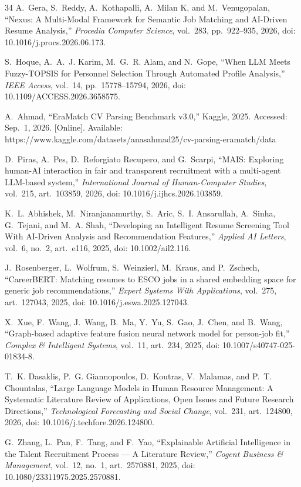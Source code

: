 \documentclass[journal]{IEEEtran}
\begin{document}
\begin{thebibliography}{34}
A.~Gera, S.~Reddy, A.~Kothapalli, A.~Milan K, and M.~Venugopalan, ``Nexus: A Multi-Modal Framework for Semantic Job Matching and AI-Driven Resume Analysis,'' \emph{Procedia Computer Science}, vol.~283, pp.~922--935, 2026, doi: 10.1016/j.procs.2026.06.173.

S.~Hoque, A.~A.~J. Karim, M.~G.~R. Alam, and N.~Gope, ``When LLM Meets Fuzzy-TOPSIS for Personnel Selection Through Automated Profile Analysis,'' \emph{IEEE Access}, vol.~14, pp.~15778--15794, 2026, doi: 10.1109/ACCESS.2026.3658575.

A.~Ahmad, ``EraMatch CV Parsing Benchmark v3.0,'' Kaggle, 2025. Accessed: Sep.~1, 2026. [Online]. Available: https://www.kaggle.com/datasets/anasahmad25/cv-parsing-eramatch/data

D.~Piras, A.~Pes, D.~Reforgiato Recupero, and G.~Scarpi, ``MAIS: Exploring human-AI interaction in fair and transparent recruitment with a multi-agent LLM-based system,'' \emph{International Journal of Human-Computer Studies}, vol.~215, art.~103859, 2026, doi: 10.1016/j.ijhcs.2026.103859.

K.~L. Abhishek, M.~Niranjanamurthy, S.~Aric, S.~I. Ansarullah, A.~Sinha, G.~Tejani, and M.~A. Shah, ``Developing an Intelligent Resume Screening Tool With AI-Driven Analysis and Recommendation Features,'' \emph{Applied AI Letters}, vol.~6, no.~2, art.~e116, 2025, doi: 10.1002/ail2.116.

J.~Rosenberger, L.~Wolfrum, S.~Weinzierl, M.~Kraus, and P.~Zschech, ``CareerBERT: Matching resumes to ESCO jobs in a shared embedding space for generic job recommendations,'' \emph{Expert Systems With Applications}, vol.~275, art.~127043, 2025, doi: 10.1016/j.eswa.2025.127043.

X.~Xue, F.~Wang, J.~Wang, B.~Ma, Y.~Yu, S.~Gao, J.~Chen, and B.~Wang, ``Graph-based adaptive feature fusion neural network model for person-job fit,'' \emph{Complex \& Intelligent Systems}, vol.~11, art.~234, 2025, doi: 10.1007/s40747-025-01834-8.

T.~K. Dasaklis, P.~G. Giannopoulos, D.~Koutras, V.~Malamas, and P.~T. Chountalas, ``Large Language Models in Human Resource Management: A Systematic Literature Review of Applications, Open Issues and Future Research Directions,'' \emph{Technological Forecasting and Social Change}, vol.~231, art.~124800, 2026, doi: 10.1016/j.techfore.2026.124800.

G.~Zhang, L.~Pan, F.~Tang, and F.~Yao, ``Explainable Artificial Intelligence in the Talent Recruitment Process --- A Literature Review,'' \emph{Cogent Business \& Management}, vol.~12, no.~1, art.~2570881, 2025, doi: 10.1080/23311975.2025.2570881.


\end{thebibliography}
\end{document}
